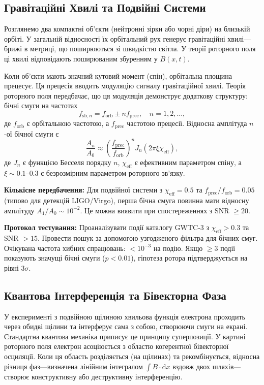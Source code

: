 \documentclass[11pt,a4paper]{article}
\numberwithin{equation}{section}
\theoremstyle{plain}
\theoremstyle{definition}
\theoremstyle{remark}
\newcommand{\dd}{\mathrm{d}}
\begin{document}
\subsection{Гравітаційні Хвилі та Подвійні Системи}

Розглянемо два компактні об'єкти (нейтронні зірки або чорні діри) на близькій орбіті. У загальній відносності їх орбітальний рух генерує гравітаційні хвилі---брижі в метриці, що поширюються зі швидкістю світла. У теорії роторного поля ці хвилі відповідають поширюваним збуренням у $B(x,t)$.

Коли об'єкти мають значний кутовий момент (спін), орбітальна площина прецесує. Ця прецесія вводить модуляцію сигналу гравітаційної хвилі. Теорія роторного поля передбачає, що ця модуляція демонструє додаткову структуру: бічні смуги на частотах
\begin{equation}
f_{\mathrm{sb},n} = f_{\mathrm{orb}} \pm n f_{\mathrm{prec}}, \quad n = 1, 2, \ldots,
\end{equation}
де $f_{\mathrm{orb}}$ є орбітальною частотою, а $f_{\mathrm{prec}}$ частотою прецесії. Відносна амплітуда $n$-ої бічної смуги є
\begin{equation}
\frac{A_n}{A_0} \approx \left(\frac{f_{\mathrm{prec}}}{f_{\mathrm{orb}}}\right)^n J_n(2\pi \xi \chi_{\mathrm{eff}}),
\end{equation}
де $J_n$ є функцією Бесселя порядку $n$, $\chi_{\mathrm{eff}}$ є ефективним параметром спіну, а $\xi \sim 0.1$--$0.3$ є безрозмірним параметром роторного зв'язку.

\textbf{Кількісне передбачення:} Для подвійної системи з $\chi_{\mathrm{eff}} = 0.5$ та $f_{\mathrm{prec}}/f_{\mathrm{orb}} = 0.05$ (типово для детекцій LIGO/Virgo), перша бічна смуга повинна мати відносну амплітуду $A_1/A_0 \sim 10^{-2}$. Це можна виявити при спостереженнях з SNR $\geq 20$.

\textbf{Протокол тестування:} Проаналізувати події каталогу GWTC-3 з $\chi_{\mathrm{eff}} > 0.3$ та SNR $> 15$. Провести пошук за допомогою узгодженого фільтра для бічних смуг. Очікувана частота хибних спрацювань: $< 10^{-3}$ на подію. Якщо $\geq 3$ події показують значущі бічні смуги ($p < 0.01$), гіпотеза ротора підтверджується на рівні $3\sigma$.

\subsection{Квантова Інтерференція та Бівекторна Фаза}

У експерименті з подвійною щілиною хвильова функція електрона проходить через обидві щілини та інтерферує сама з собою, створюючи смуги на екрані. Стандартна квантова механіка приписує це принципу суперпозиції. У картині роторного поля електрон асоціюється з областю когерентної бівекторної осциляції. Коли ця область розділяється (на щілинах) та рекомбінується, відносна різниця фаз---визначена лінійним інтегралом $\int B \cdot \dd x$ вздовж двох шляхів---створює конструктивну або деструктивну інтерференцію.
\end{document}

